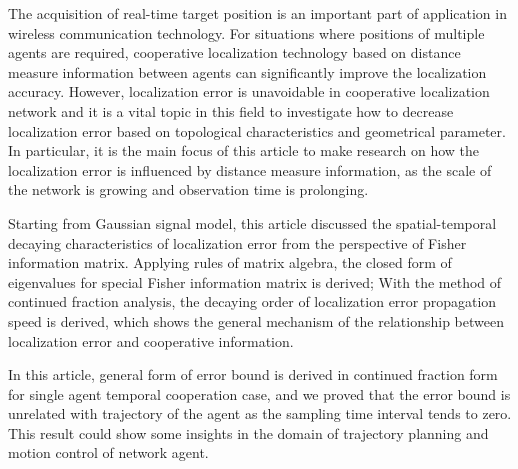 
\begin{eabstract}
The acquisition of real-time target position is an important part of application in wireless communication technology. For situations where positions of multiple agents are required, cooperative localization technology based on distance measure information between agents can significantly improve the localization accuracy. However, localization error is unavoidable in cooperative localization network and it is a vital topic in this field to investigate how to decrease localization error based on topological characteristics and geometrical parameter. In particular, it is the main focus of this article to make research on how the localization error
is influenced by distance measure information, as the scale of the network is growing and observation time is prolonging.

Starting from Gaussian signal model, this article discussed the spatial-temporal decaying characteristics of localization error from the perspective of Fisher information matrix. Applying rules of matrix algebra, the closed form of eigenvalues for special Fisher information matrix is derived; With the method of continued fraction analysis, the decaying order of localization error propagation speed is derived, which shows the general mechanism of the relationship between localization error and cooperative information.

In this article, general form of error bound is derived in continued fraction form for single agent temporal cooperation case, and we proved that the error bound is unrelated with trajectory of the agent as the sampling time interval tends to zero. This result could show some insights in the domain of trajectory planning and motion control of network agent.

\end{eabstract}

